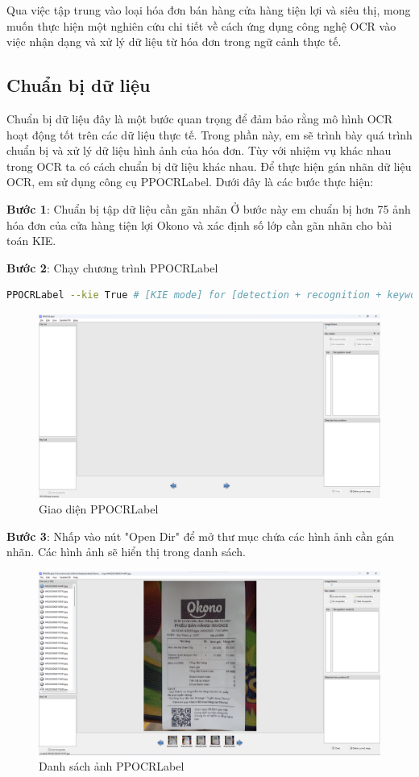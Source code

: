 Qua việc tập trung vào loại hóa đơn bán hàng cửa hàng tiện lợi và siêu thị, mong muốn thực hiện một nghiên cứu chi tiết về cách ứng dụng công nghệ OCR vào việc nhận dạng và xử lý dữ liệu từ hóa đơn trong ngữ cảnh thực tế.

\subsection{Chuẩn bị dữ liệu}
Chuẩn bị dữ liệu đây là một bước quan trọng để đảm bảo rằng mô hình OCR hoạt động tốt trên các dữ liệu thực tế. Trong phần này, em sẽ trình bày quá trình chuẩn bị và xử lý dữ liệu hình ảnh của hóa đơn. Tùy với nhiệm vụ khác nhau trong OCR ta có cách chuẩn bị dữ liệu khác nhau. Để thực hiện gán nhãn dữ liệu OCR, em sử dụng công cụ PPOCRLabel. Dưới đây là các bước thực hiện:

\textbf{Bước 1}: Chuẩn bị tập dữ liệu cần gãn nhãn
Ở bước này em chuẩn bị hơn 75 ảnh hóa đơn của cửa hàng tiện lợi Okono và xác định số lớp cần gãn nhãn cho bài toán KIE.  

\textbf{Bước 2}: Chạy chương trình PPOCRLabel
\begin{lstlisting}[language=bash]
    PPOCRLabel --kie True # [KIE mode] for [detection + recognition + keyword extraction] labeling
\end{lstlisting}
\begin{figure}[h]
    \includegraphics[scale=0.25]{images/UI-ppocr.png}
    \centering
    \caption{Giao diện PPOCRLabel}
\end{figure}

\textbf{Bước 3}: Nhấp vào nút "Open Dir" để mở thư mục chứa các hình ảnh cần gán nhãn. Các hình ảnh sẽ hiển thị trong danh sách.
\begin{figure}[h]
    \includegraphics[scale=0.25]{images/UI-ppocr-image.png}
    \centering
    \caption{Danh sách ảnh PPOCRLabel}
\end{figure}

